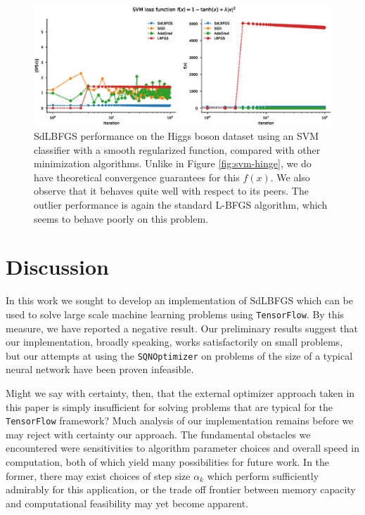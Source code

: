 \documentclass{article}
\begin{document}
\begin{figure}[h]
  \centering
  \includegraphics[width=\textwidth]{../plots/svm_tan_regularized_loss.eps}
  \caption{
    SdLBFGS performance on the Higgs boson dataset using an SVM classifier with
    a smooth regularized function, compared with other minimization algorithms.
    Unlike in Figure \ref{fig:svm-hinge}, we do have theoretical convergence
    guarantees for this $f(x)$. We also
    observe that it behaves quite well with respect to its peers. The outlier
    performance is again the standard L-BFGS algorithm, which seems to behave poorly
    on this problem.
  }
  \label{fig:svm-tan}
\end{figure}


\section{Discussion}

In this work we sought to develop an implementation of SdLBFGS which can be used
to solve large scale machine learning problems using \texttt{TensorFlow}. By
this measure, we have reported a negative result. Our preliminary results
suggest that our implementation, broadly speaking, works satisfactorily on small
problems, but our attempts at using the \texttt{SQNOptimizer} on problems of the
size of a typical neural network have been proven infeasible.

Might we say with certainty, then, that the external optimizer approach taken in
this paper is simply insufficient for solving problems that are typical for the
\texttt{TensorFlow} framework? Much analysis of our implementation remains
before we may reject with certainty our approach. The fundamental obstacles we
encountered were sensitivities to algorithm parameter choices and overall speed
in computation, both of which yield many possibilities for future work. In the
former, there may exist choices of step size $\alpha_k$ which perform
sufficiently admirably for this application, or the trade off frontier between
memory capacity and computational feasibility may yet become apparent.
\end{document}
